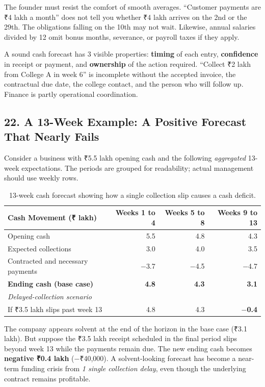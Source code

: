 The founder must resist the comfort of smooth averages. ``Customer payments are ₹4 lakh a month'' does not tell you whether ₹4 lakh arrives on the 2nd or the 29th. The obligations falling on the 10th may not wait. Likewise, annual salaries divided by 12 omit bonus months, severance, or payroll taxes if they apply.

A sound cash forecast has 3 visible properties: \textbf{timing} of each entry, \textbf{confidence} in receipt or payment, and \textbf{ownership} of the action required. ``Collect ₹2 lakh from College A in week 6'' is incomplete without the accepted invoice, the contractual due date, the college contact, and the person who will follow up. Finance is partly operational coordination.

\subsection*{22. A 13-Week Example: A Positive Forecast That Nearly Fails}

Consider a business with ₹5.5 lakh opening cash and the following \emph{aggregated} 13-week expectations. The periods are grouped for readability; actual management should use weekly rows.

\begin{table}[htbp]
\centering
\small
\begin{tabularx}{\textwidth}{Xrrr}
\toprule
\textbf{Cash Movement (₹ lakh)} & \textbf{Weeks 1 to 4} & \textbf{Weeks 5 to 8} & \textbf{Weeks 9 to 13} \\
\midrule
Opening cash & 5.5 & 4.8 & 4.3 \\
Expected collections & 3.0 & 4.0 & 3.5 \\
Contracted and necessary payments & $-$3.7 & $-$4.5 & $-$4.7 \\
\midrule
\textbf{Ending cash (base case)} & \textbf{4.8} & \textbf{4.3} & \textbf{3.1} \\
\midrule
\emph{Delayed-collection scenario} & & & \\
If ₹3.5 lakh slips past week 13 & 4.8 & 4.3 & \textbf{$-$0.4} \\
\bottomrule
\end{tabularx}
\caption{13-week cash forecast showing how a single collection slip causes a cash deficit.}
\end{table}

The company appears solvent at the end of the horizon in the base case (₹3.1 lakh). But suppose the ₹3.5 lakh receipt scheduled in the final period slips beyond week 13 while the payments remain due. The new ending cash becomes \textbf{negative ₹0.4 lakh} ($-$₹40,000). A solvent-looking forecast has become a near-term funding crisis from \emph{1 single collection delay}, even though the underlying contract remains profitable.

